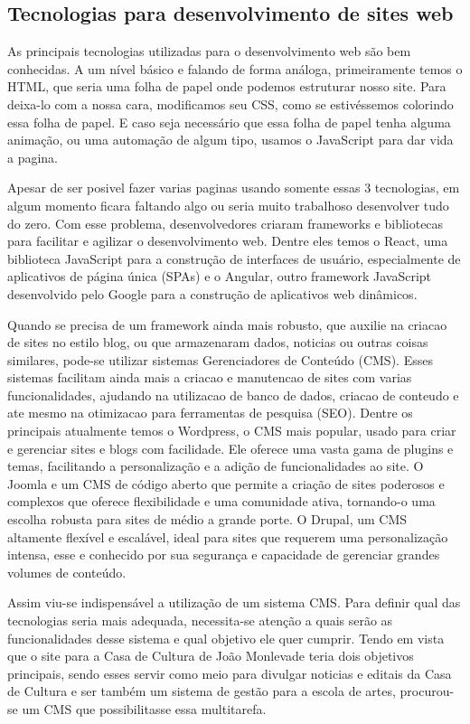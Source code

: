 \subsection{Tecnologias para desenvolvimento de sites web}

As principais tecnologias utilizadas para o desenvolvimento web são bem conhecidas. A um nível básico e falando de forma análoga, primeiramente temos o HTML, que seria uma folha de papel onde podemos estruturar nosso site. Para deixa-lo com a nossa cara, modificamos seu CSS, como se estivéssemos colorindo essa folha de papel. E caso seja necessário que essa folha de papel tenha alguma animação, ou uma automação de algum tipo, usamos o JavaScript para dar vida a pagina.

Apesar de ser posivel fazer varias paginas usando somente essas 3 tecnologias, em algum momento ficara faltando algo ou seria muito trabalhoso desenvolver tudo do zero. Com esse problema, desenvolvedores criaram frameworks e bibliotecas para facilitar e agilizar o desenvolvimento web. Dentre eles temos o React, uma biblioteca JavaScript para a construção de interfaces de usuário, especialmente de aplicativos de página única (SPAs) e o Angular, outro framework JavaScript desenvolvido pelo Google para a construção de aplicativos web dinâmicos.

Quando se precisa de um framework ainda mais robusto, que auxilie na criacao de sites no estilo blog, ou que armazenaram dados, noticias ou outras coisas similares, pode-se utilizar sistemas Gerenciadores de Conteúdo (CMS). Esses sistemas facilitam ainda mais a criacao e manutencao de sites com varias funcionalidades, ajudando na utilizacao de banco de dados, criacao de conteudo e ate mesmo na otimizacao para ferramentas de pesquisa (SEO). Dentre os principais atualmente temos o Wordpress, o CMS mais popular, usado para criar e gerenciar sites e blogs com facilidade. Ele oferece uma vasta gama de plugins e temas, facilitando a personalização e a adição de funcionalidades ao site. O Joomla e um CMS de código aberto que permite a criação de sites poderosos e complexos que oferece flexibilidade e uma comunidade ativa, tornando-o uma escolha robusta para sites de médio a grande porte. O Drupal, um CMS altamente flexível e escalável, ideal para sites que requerem uma personalização intensa, esse e conhecido por sua segurança e capacidade de gerenciar grandes volumes de conteúdo.

Assim viu-se indispensável a utilização de um sistema CMS. Para definir qual das tecnologias seria mais adequada, necessita-se atenção a quais serão as funcionalidades desse sistema e qual objetivo ele quer cumprir. Tendo em vista que o site para a Casa de Cultura de João Monlevade teria dois objetivos principais, sendo esses servir como meio para divulgar noticias e editais da Casa de Cultura e ser também um sistema de gestão para a escola de artes, procurou-se um CMS que possibilitasse essa multitarefa.

